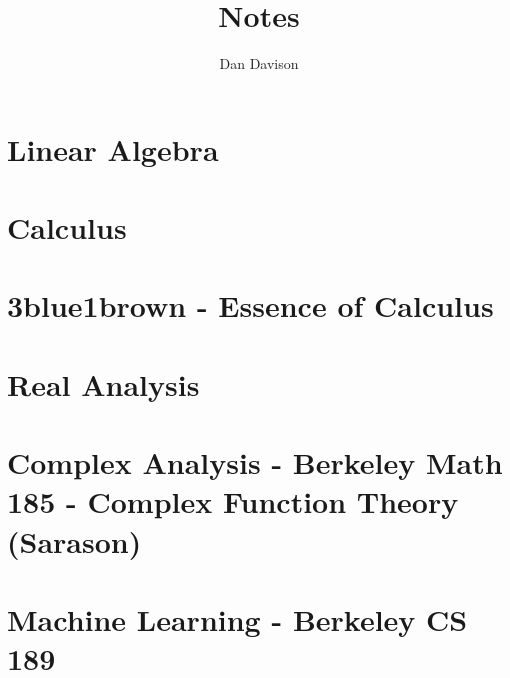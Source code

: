 \documentclass{book}
\title{Notes}
\author{Dan Davison}
\begin{document}
\frontmatter
\maketitle
\tableofcontents
\mainmatter

\chapter{Linear Algebra}


\chapter{Calculus}


\chapter{3blue1brown - Essence of Calculus}


\chapter{Real Analysis}


\chapter{Complex Analysis - Berkeley Math 185 - Complex Function Theory (Sarason)}


\chapter{Machine Learning - Berkeley CS 189}


\end{document}
